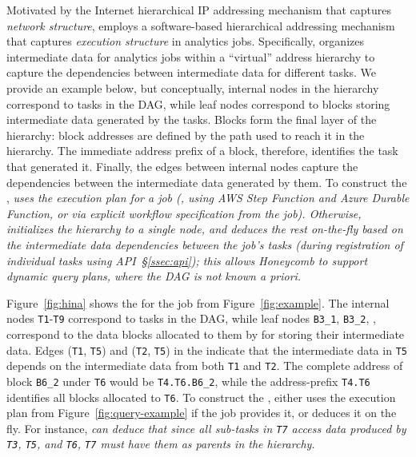 Motivated by the Internet hierarchical IP addressing mechanism that captures \textit{network structure}, \jiffy employs a software-based hierarchical addressing mechanism that captures \textit{execution structure} in analytics jobs. Specifically, \jiffy organizes intermediate data for analytics jobs within a ``virtual'' address hierarchy to capture the dependencies between intermediate data for different tasks. We provide an example below, but conceptually, internal nodes in the hierarchy correspond to tasks in the DAG, while leaf nodes correspond to \jiffy blocks storing intermediate data generated by the tasks. Blocks form the final layer of the hierarchy: block addresses are defined by the path used to reach it in the hierarchy. The immediate address prefix of a block, therefore, identifies the task that generated it. Finally, the edges between internal nodes capture the dependencies between the intermediate data generated by them. To construct the \lh, \sl uses the execution plan for a job (\eg, using AWS Step Function and Azure Durable Function, or via explicit workflow specification from the job). Otherwise, \sl initializes the hierarchy to a single node, and {\em deduces} the rest on-the-fly based on the intermediate data dependencies between the job's tasks (during registration of individual tasks using \jiffy API~\S\ref{ssec:api}); this allows Honeycomb to support dynamic query plans, where the DAG is not known a priori. 

 Figure~\ref{fig:hina} shows the \lh for the job from Figure~\ref{fig:example}. The internal nodes \texttt{T1}-\texttt{T9} correspond to tasks in the DAG, while leaf nodes \texttt{B3\_1}, \texttt{B3\_2}, \etc, correspond to the data blocks allocated to them by \jiffy for storing their intermediate data. Edges (\texttt{T1}, \texttt{T5}) and (\texttt{T2}, \texttt{T5}) in the \lh indicate that the intermediate data in \texttt{T5} depends on the intermediate data from both \texttt{T1} and \texttt{T2}. The complete address of block \texttt{B6\_2} under \texttt{T6} would be \texttt{T4.T6.B6\_2}, while the address-prefix \texttt{T4.T6} identifies all blocks allocated to \texttt{T6}. To construct the \lh, \jiffy either uses the execution plan from Figure~\ref{fig:query-example} if the job provides it, or deduces it on the fly. For instance, \sl can deduce that since all sub-tasks in \texttt{T7} access data produced by \texttt{T3}, \texttt{T5}, and \texttt{T6}, \texttt{T7} must have them as parents in the hierarchy.

